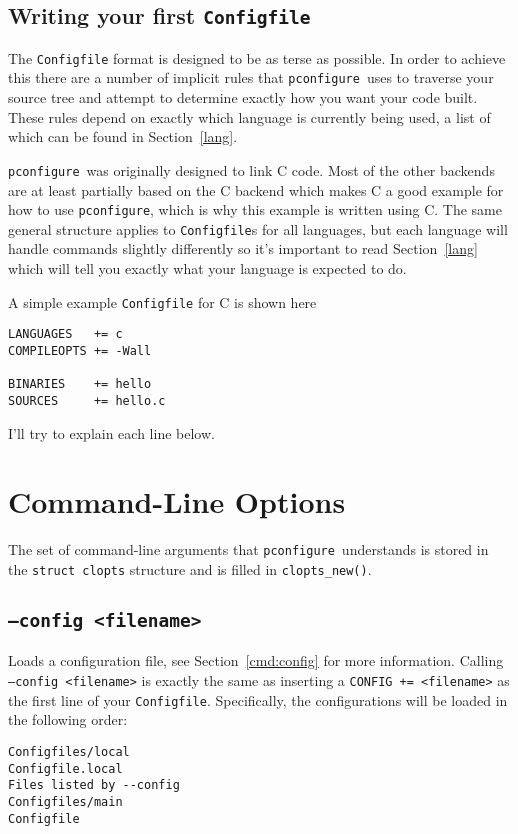 \documentclass{article}
\newcommand{\pconfigure}{\texttt{pconfigure}}
\begin{document}
\subsection{Writing your first \texttt{Configfile}}

The \texttt{Configfile} format is designed to be as terse as possible.
In order to achieve this there are a number of implicit rules that
\pconfigure\ uses to traverse your source tree and attempt to
determine exactly how you want your code built.  These rules depend on
exactly which language is currently being used, a list of which can be
found in Section~\ref{lang}.

\pconfigure\ was originally designed to link C code.  Most of the
other backends are at least partially based on the C backend which
makes C a good example for how to use \pconfigure, which is why this
example is written using C.  The same general structure applies to
\texttt{Configfile}s for all languages, but each language will handle
commands slightly differently so it's important to read
Section~\ref{lang} which will tell you exactly what your language is
expected to do.

A simple example \texttt{Configfile} for C is shown here
\begin{verbatim}
LANGUAGES   += c
COMPILEOPTS += -Wall

BINARIES    += hello
SOURCES     += hello.c
\end{verbatim}
I'll try to explain each line below.

\section{Command-Line Options \label{cl}}

The set of command-line arguments that \pconfigure\ understands is
stored in the \texttt{struct clopts} structure and is filled in
\texttt{clopts\_new()}.

\subsection{\texttt{--config <filename>}}

Loads a configuration file, see Section~\ref{cmd:config} for more
information.  Calling \texttt{--config <filename>} is exactly the same
as inserting a \texttt{CONFIG += <filename>} as the first line of your
\texttt{Configfile}.  Specifically, the configurations will be loaded
in the following order:

\begin{verbatim}
Configfiles/local
Configfile.local
Files listed by --config
Configfiles/main
Configfile
\end{verbatim}
\end{document}
